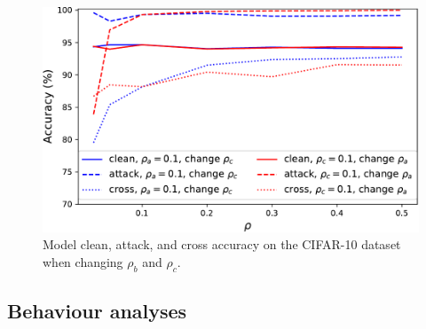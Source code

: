 \documentclass{article}
\begin{document}
\begin{center}
    \begin{figure}[h!]
    \begin{center}
     \includegraphics[scale=0.57]{figures/rho_figure.pdf}
    \end{center}
    \caption{Model clean, attack, and cross accuracy on the CIFAR-10 dataset when changing $\rho_b$ and $\rho_c$.}
    \label{fig:rho analysis}
    \end{figure}
    \vspace{-2mm}
\end{center}

\subsection{Behaviour analyses}
\end{document}

